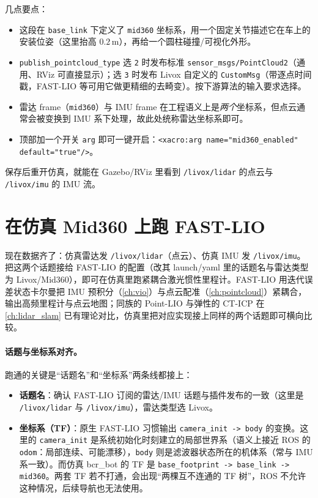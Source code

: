 几点要点：

\begin{itemize}
  \item 这段在 \verb|base_link| 下定义了 \verb|mid360| 坐标系，用一个固定关节描述它在车上的安装位姿（这里抬高 $0.2\,\mathrm{m}$），再给一个圆柱碰撞/可视化外形。
  \item \verb|publish_pointcloud_type| 选 \verb|2| 时发布标准 \verb|sensor_msgs/PointCloud2|（通用、RViz 可直接显示）；选 \verb|3| 时发布 Livox 自定义的 \verb|CustomMsg|（带逐点时间戳，FAST-LIO 等可用它做更精细的去畸变）。按下游算法的输入要求选择。
  \item 雷达 frame（\verb|mid360|）与 IMU frame 在工程语义上是\emph{两个}坐标系，但点云通常会被变换到 IMU 系下处理，故此处统称雷达坐标系即可。
  \item 顶部加一个开关 \verb|arg| 即可一键开启：\verb|<xacro:arg name="mid360_enabled" default="true"/>|。
\end{itemize}

保存后重开仿真，就能在 Gazebo/RViz 里看到 \verb|/livox/lidar| 的点云与 \verb|/livox/imu| 的 IMU 流。

\section{在仿真 Mid360 上跑 FAST-LIO}

现在数据齐了：仿真雷达发 \verb|/livox/lidar|（点云）、仿真 IMU 发 \verb|/livox/imu|。把这两个话题接给 FAST-LIO 的配置（改其 launch/yaml 里的话题名与雷达类型为 Livox/Mid360），即可在仿真里跑紧耦合激光惯性里程计。FAST-LIO 用迭代误差状态卡尔曼把 IMU 预积分（\cref{ch:vio}）与点云配准（\cref{ch:pointcloud}）紧耦合，输出高频里程计与点云地图\cite{xu2021fastlio}；同族的 Point-LIO\cite{he2023pointlio} 与弹性的 CT-ICP\cite{dellenbach2022cticp} 在 \cref{ch:lidar_slam} 已有理论对比，仿真里把对应实现接上同样的两个话题即可横向比较。

\paragraph{话题与坐标系对齐。}跑通的关键是“话题名”和“坐标系”两条线都接上：

\begin{itemize}
  \item \textbf{话题名}：确认 FAST-LIO 订阅的雷达/IMU 话题与插件发布的一致（这里是 \verb|/livox/lidar| 与 \verb|/livox/imu|），雷达类型选 Livox。
  \item \textbf{坐标系（TF）}：原生 FAST-LIO 习惯输出 \verb|camera_init -> body| 的变换。这里的 \verb|camera_init| 是系统初始化时刻建立的局部世界系（语义上接近 ROS 的 \verb|odom|：局部连续、可能漂移），\verb|body| 则是滤波器状态所在的机体系（常与 IMU 系一致）。而仿真 bcr\_bot 的 TF 是 \verb|base_footprint -> base_link -> mid360|。两套 TF 若不打通，会出现“两棵互不连通的 TF 树”，ROS 不允许这种情况，后续导航也无法使用。
\end{itemize}

